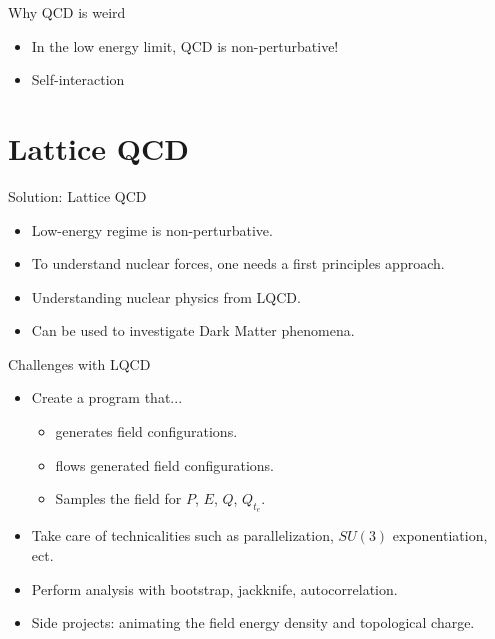 \documentclass[10pt]{beamer}
\begin{document}
\begin{frame}{Why QCD is weird}
	\begin{itemize}
		\item In the low energy limit, QCD is non-perturbative!
		\item Self-interaction
	\end{itemize}
\end{frame}

\section{Lattice QCD}

\begin{frame}{Solution: Lattice QCD}
	\begin{itemize}%
		\item Low-energy regime is non-perturbative.
		\item To understand nuclear forces, one needs a first principles approach.
		\item Understanding nuclear physics from LQCD.
		\item Can be used to investigate Dark Matter phenomena.
	\end{itemize}
\end{frame}

\begin{frame}{Challenges with LQCD}
	\begin{itemize}%
		\item Create a program that...
		\begin{itemize}%
			\item generates field configurations.
			\item flows generated field configurations.
			\item Samples the field for $P$, $E$, $Q$, $Q_{t_e}$.
		\end{itemize}
		\item Take care of technicalities such as parallelization, $SU(3)$ exponentiation, ect.
		\item Perform analysis with bootstrap, jackknife, autocorrelation.
		\item Side projects: animating the field energy density and topological charge.
	\end{itemize}
\end{frame}
\end{document}
